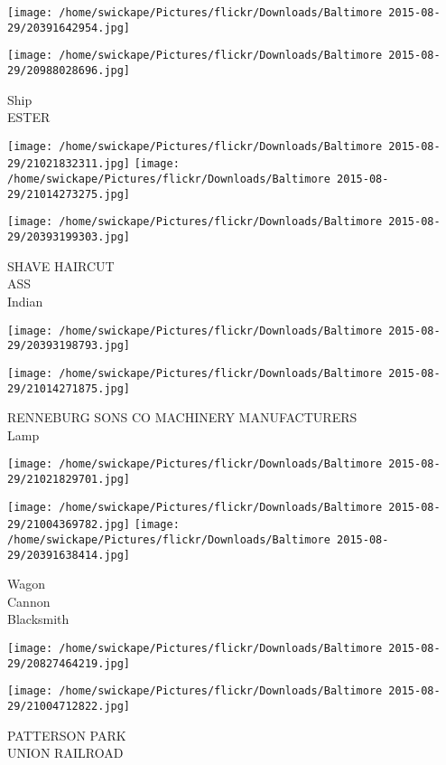 \documentclass[10pt,letterpaper]{article}
\begin{document}
\texttt{[image: /home/swickape/Pictures/flickr/Downloads/Baltimore 2015-08-29/20391642954.jpg]}

\vspace{0.25in}
\texttt{[image: /home/swickape/Pictures/flickr/Downloads/Baltimore 2015-08-29/20988028696.jpg]}

Ship\\
ESTER
\pagebreak

\texttt{[image: /home/swickape/Pictures/flickr/Downloads/Baltimore 2015-08-29/21021832311.jpg]}
\texttt{[image: /home/swickape/Pictures/flickr/Downloads/Baltimore 2015-08-29/21014273275.jpg]}

\texttt{[image: /home/swickape/Pictures/flickr/Downloads/Baltimore 2015-08-29/20393199303.jpg]}

SHAVE HAIRCUT\\
ASS\\
Indian
\pagebreak

\texttt{[image: /home/swickape/Pictures/flickr/Downloads/Baltimore 2015-08-29/20393198793.jpg]}

\vspace{0.25in}
\texttt{[image: /home/swickape/Pictures/flickr/Downloads/Baltimore 2015-08-29/21014271875.jpg]}

RENNEBURG SONS CO MACHINERY MANUFACTURERS\\
Lamp
\pagebreak

\texttt{[image: /home/swickape/Pictures/flickr/Downloads/Baltimore 2015-08-29/21021829701.jpg]}

\vspace{0.25in}
\texttt{[image: /home/swickape/Pictures/flickr/Downloads/Baltimore 2015-08-29/21004369782.jpg]}
\texttt{[image: /home/swickape/Pictures/flickr/Downloads/Baltimore 2015-08-29/20391638414.jpg]}

Wagon\\
Cannon\\
Blacksmith
\pagebreak

\texttt{[image: /home/swickape/Pictures/flickr/Downloads/Baltimore 2015-08-29/20827464219.jpg]}

\vspace{0.25in}
\texttt{[image: /home/swickape/Pictures/flickr/Downloads/Baltimore 2015-08-29/21004712822.jpg]}

PATTERSON PARK\\
UNION RAILROAD
\pagebreak
\end{document}
